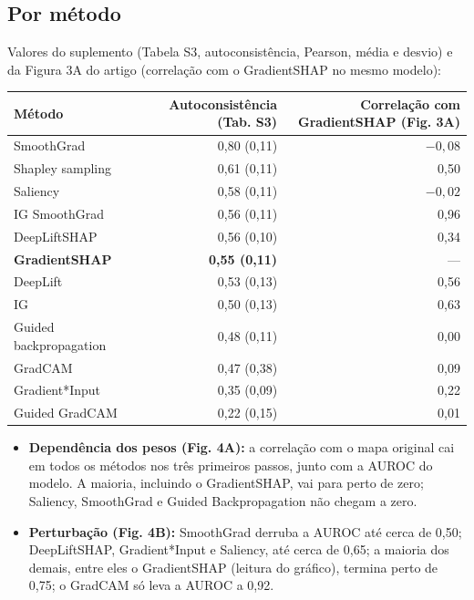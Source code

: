 \documentclass[11pt,a4paper]{article}
\begin{document}
\subsection{Por método}
Valores do suplemento (Tabela S3, autoconsistência, Pearson, média e desvio) e da Figura 3A do artigo (correlação com o GradientSHAP no mesmo modelo):
\begin{center}\small
\begin{tabular}{lrr}
\toprule
\textbf{Método} & \textbf{Autoconsistência (Tab. S3)} & \textbf{Correlação com GradientSHAP (Fig. 3A)} \\
\midrule
SmoothGrad & 0,80 (0,11) & $-0{,}08$ \\
Shapley sampling & 0,61 (0,11) & 0,50 \\
Saliency & 0,58 (0,11) & $-0{,}02$ \\
IG SmoothGrad & 0,56 (0,11) & 0,96 \\
DeepLiftSHAP & 0,56 (0,10) & 0,34 \\
\textbf{GradientSHAP} & \textbf{0,55 (0,11)} & --- \\
DeepLift & 0,53 (0,13) & 0,56 \\
IG & 0,50 (0,13) & 0,63 \\
Guided backpropagation & 0,48 (0,11) & 0,00 \\
GradCAM & 0,47 (0,38) & 0,09 \\
Gradient*Input & 0,35 (0,09) & 0,22 \\
Guided GradCAM & 0,22 (0,15) & 0,01 \\
\bottomrule
\end{tabular}
\end{center}
\begin{itemize}
\item \textbf{Dependência dos pesos (Fig. 4A):} a correlação com o mapa original cai em todos os métodos nos três primeiros passos, junto com a AUROC do modelo. A maioria, incluindo o GradientSHAP, vai para perto de zero; Saliency, SmoothGrad e Guided Backpropagation não chegam a zero.
\item \textbf{Perturbação (Fig. 4B):} SmoothGrad derruba a AUROC até cerca de 0,50; DeepLiftSHAP, Gradient*Input e Saliency, até cerca de 0,65; a maioria dos demais, entre eles o GradientSHAP (leitura do gráfico), termina perto de 0,75; o GradCAM só leva a AUROC a 0,92.
\end{itemize}
\end{document}
